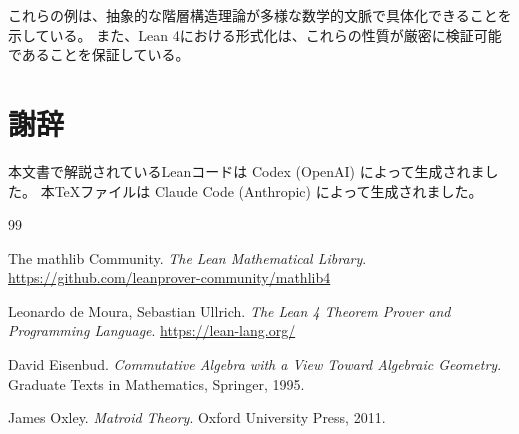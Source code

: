 \documentclass[a4paper,11pt]{ltjsarticle}
\theoremstyle{definition}
\begin{document}
これらの例は、抽象的な階層構造理論が多様な数学的文脈で具体化できることを示している。
また、Lean 4における形式化は、これらの性質が厳密に検証可能であることを保証している。

\section*{謝辞}

本文書で解説されているLeanコードは Codex (OpenAI) によって生成されました。
本TeXファイルは Claude Code (Anthropic) によって生成されました。

\begin{thebibliography}{99}

The mathlib Community.
\textit{The Lean Mathematical Library}.
\url{https://github.com/leanprover-community/mathlib4}

Leonardo de Moura, Sebastian Ullrich.
\textit{The Lean 4 Theorem Prover and Programming Language}.
\url{https://lean-lang.org/}

David Eisenbud.
\textit{Commutative Algebra with a View Toward Algebraic Geometry}.
Graduate Texts in Mathematics, Springer, 1995.

James Oxley.
\textit{Matroid Theory}.
Oxford University Press, 2011.

\end{thebibliography}
\end{document}
